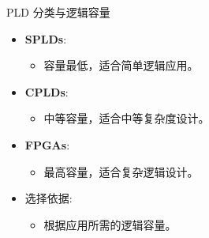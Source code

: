 \begin{frame}
\begin{block}{PLD 分类与逻辑容量}
\begin{itemize}
\tightlist
\item
    \textbf{SPLDs}:

    \begin{itemize}
    \tightlist
    \item
    容量最低，适合简单逻辑应用。
    \end{itemize}
\item
    \textbf{CPLDs}:

    \begin{itemize}
    \tightlist
    \item
    中等容量，适合中等复杂度设计。
    \end{itemize}
\item
    \textbf{FPGAs}:

    \begin{itemize}
    \tightlist
    \item
    最高容量，适合复杂逻辑设计。
    \end{itemize}
\item
    选择依据:

    \begin{itemize}
    \tightlist
    \item
    根据应用所需的逻辑容量。
    \end{itemize}
\end{itemize}
\end{block}
\end{frame}